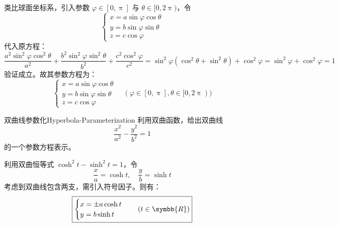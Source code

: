 \begin{solution}
    类比球面坐标系，引入参数 $\varphi \in [0, \uppi]$ 与 $\theta \in [0, 2\uppi)$，令
    \begin{equation*}
        \begin{cases}
            x = a \sin \varphi \cos \theta \\
            y = b \sin \varphi \sin \theta \\
            z = c \cos \varphi
        \end{cases}
    \end{equation*}
    代入原方程：
    \begin{equation*}
        \frac{a^2 \sin^2 \varphi \cos^2 \theta}{a^2} + \frac{b^2 \sin^2 \varphi \sin^2 \theta}{b^2} + \frac{c^2 \cos^2 \varphi}{c^2} = \sin^2 \varphi (\cos^2 \theta + \sin^2 \theta) + \cos^2 \varphi = \sin^2 \varphi + \cos^2 \varphi = 1
    \end{equation*}
    验证成立。故其参数方程为：
    \begin{equation*}
        \boxed{\begin{cases} x = a \sin \varphi \cos \theta \\ y = b \sin \varphi \sin \theta \\ z = c \cos \varphi \end{cases} \quad (\varphi \in [0, \uppi], \theta \in [0, 2\uppi))}
    \end{equation*}
\end{solution}

\begin{problem}{双曲线参数化}{Hyperbola-Parameterization}
    利用双曲函数，给出双曲线
    \begin{equation*}
        \frac{x^2}{a^2} - \frac{y^2}{b^2} = 1
    \end{equation*}
    的一个参数方程表示。
\end{problem}

\begin{solution}
    利用双曲恒等式 $\cosh^2 t - \sinh^2 t = 1$，令
    \begin{equation*}
        \frac{x}{a} = \cosh t, \quad \frac{y}{b} = \sinh t
    \end{equation*}
    考虑到双曲线包含两支，需引入符号因子。则有：
    \begin{equation*}
        \boxed{\begin{cases} x = \pm a \cosh t \\ y = b \sinh t \end{cases} \quad (t \in \symbb{R})}
    \end{equation*}
\end{solution}

